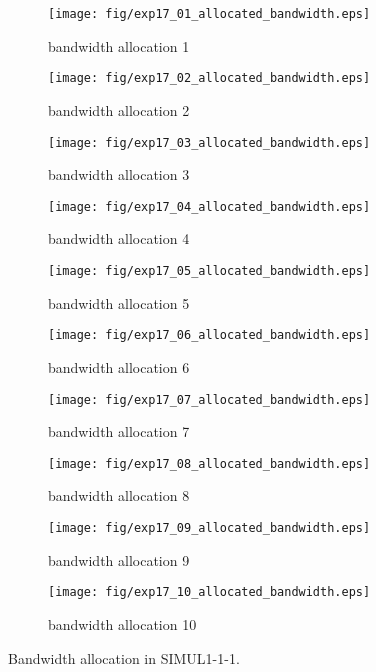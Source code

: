 	\begin{figure}
		\begin{center}
			\begin{subfigure}[b]{0.32\textwidth}
				\texttt{[image: fig/exp17\_01\_allocated\_bandwidth.eps]}
				\caption{bandwidth allocation 1}
				\label{figure:simul1_1_1_b_a}
			\end{subfigure}
			\begin{subfigure}[b]{0.32\textwidth}
				\texttt{[image: fig/exp17\_02\_allocated\_bandwidth.eps]}
				\caption{bandwidth allocation 2}
				\label{figure:simul1_1_1_b_b}
			\end{subfigure}
			\begin{subfigure}[b]{0.32\textwidth}
				\texttt{[image: fig/exp17\_03\_allocated\_bandwidth.eps]}
				\caption{bandwidth allocation 3}
				\label{figure:simul1_1_1_b_c}
			\end{subfigure}
			\begin{subfigure}[b]{0.32\textwidth}
				\texttt{[image: fig/exp17\_04\_allocated\_bandwidth.eps]}
				\caption{bandwidth allocation 4}
				\label{figure:simul1_1_1_b_d}
			\end{subfigure}
			\begin{subfigure}[b]{0.32\textwidth}
				\texttt{[image: fig/exp17\_05\_allocated\_bandwidth.eps]}
				\caption{bandwidth allocation 5}
				\label{figure:simul1_1_1_b_e}
			\end{subfigure}
			\begin{subfigure}[b]{0.32\textwidth}
				\texttt{[image: fig/exp17\_06\_allocated\_bandwidth.eps]}
				\caption{bandwidth allocation 6}
				\label{figure:simul1_1_1_b_f}
			\end{subfigure}
			\begin{subfigure}[b]{0.32\textwidth}
				\texttt{[image: fig/exp17\_07\_allocated\_bandwidth.eps]}
				\caption{bandwidth allocation 7}
				\label{figure:simul1_1_1_b_g}
			\end{subfigure}
			\begin{subfigure}[b]{0.32\textwidth}
				\texttt{[image: fig/exp17\_08\_allocated\_bandwidth.eps]}
				\caption{bandwidth allocation 8}
				\label{figure:simul1_1_1_b_h}
			\end{subfigure}
			\begin{subfigure}[b]{0.32\textwidth}
				\texttt{[image: fig/exp17\_09\_allocated\_bandwidth.eps]}
				\caption{bandwidth allocation 9}
				\label{figure:simul1_1_1_b_i}
			\end{subfigure}
			\begin{subfigure}[b]{0.32\textwidth}
				\texttt{[image: fig/exp17\_10\_allocated\_bandwidth.eps]}
				\caption{bandwidth allocation 10}
				\label{figure:simul1_1_1_b_j}
			\end{subfigure}
			\caption{Bandwidth allocation in SIMUL1-1-1.}
			\label{figure:simul1_1_1_ba}
		\end{center}
	\end{figure}
	
